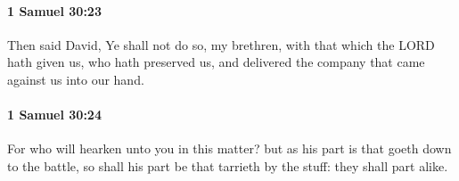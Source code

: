 		\paragraph{1 Samuel 30:23} %
			\label{1SAMUEL-30-23}

			Then said David, Ye shall not do so, my brethren, with that which the LORD hath given us, who hath preserved us, and delivered the company that came against us into our hand.


		\paragraph{1 Samuel 30:24} %
			\label{1SAMUEL-30-24}

			For who will hearken unto you in this matter? but as his part is that goeth down to the battle, so shall his part be that tarrieth by the stuff: they shall part alike.


